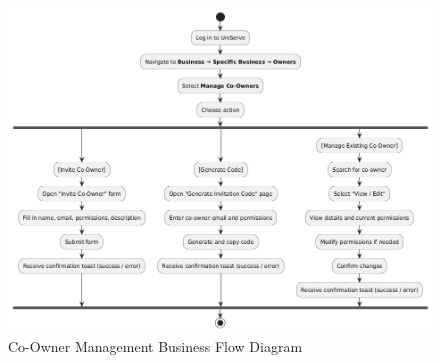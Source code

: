 \documentclass[]{VUMIFTemplateClass}
\begin{document}
\begin{figure}[H]
    \centering
    \includegraphics[width=1\textwidth]{docs/ps-design/design-document/images/diagrams/business/bpmn_user_manage_coowner.png}
    \caption{Co-Owner Management Business Flow Diagram}
    \label{fig:user_manage_flow}
\end{figure}
\end{document}
